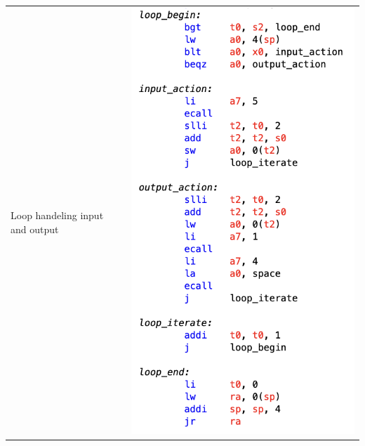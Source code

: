 \documentclass[10pt,a4paper]{article}
\begin{document}
\begin{ans}
\begin{table}[htbp]
\begin{center}
\begin{tabular}[H]{|M{3cm}|M{12cm}|}
					\hline
					Loop handeling input and output
					& \includegraphics[scale = 0.7]{Lab1-3-2.png}\\


\end{tabular}
\end{center}
\end{table}
\end{ans}
\end{document}
